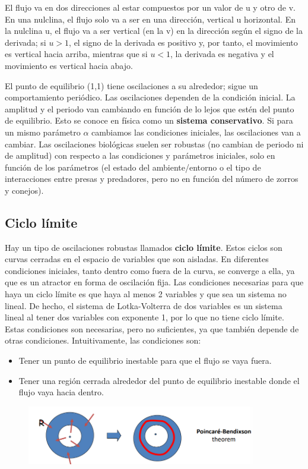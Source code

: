 El flujo va en dos direcciones al estar compuestos por un valor de u y otro de v. En una nulclina, el flujo solo va a ser en una dirección, vertical u horizontal. En la nulclina u, el flujo va a ser vertical (en la v) en la dirección según el signo de la derivada; si $u > 1$, el signo de la derivada es positivo y, por tanto, el movimiento es vertical hacia arriba, mientras que si $u < 1$, la derivada es negativa y el movimiento es vertical hacia abajo. 

El punto de equilibrio (1,1) tiene oscilaciones a su alrededor; sigue un comportamiento periódico. Las oscilaciones dependen de la condición inicial. La amplitud y el periodo van cambiando en función de lo lejos que estén del punto de equilibrio. Esto se conoce en física como un \textbf{sistema conservativo}.
Si para un mismo parámetro $\alpha$ cambiamos las condiciones iniciales, las oscilaciones van a cambiar. Las oscilaciones biológicas suelen ser robustas (no cambian de periodo ni de amplitud) con respecto a las condiciones y parámetros iniciales, solo en función de los parámetros (el estado del ambiente/entorno o el tipo de interacciones entre presas y predadores, pero no en función del número de zorros y conejos).

\subsection{Ciclo límite}
Hay un tipo de oscilaciones robustas llamados \textbf{ciclo límite}. Estos ciclos son curvas cerradas en el espacio de variables que son aisladas. En diferentes condiciones iniciales, tanto dentro como fuera de la curva, se converge a ella, ya que es un atractor en forma de oscilación fija. Las condiciones necesarias para que haya un ciclo límite es que haya al menos 2 variables y que sea un sistema no lineal. De hecho, el sistema de Lotka-Volterra de dos variables es un sistema lineal al tener dos variables con exponente 1, por lo que no tiene ciclo límite. Estas condiciones son necesarias, pero no suficientes, ya que también depende de otras condiciones. Intuitivamente, las condiciones son:
\begin{itemize}
\item Tener un punto de equilibrio inestable para que el flujo se vaya fuera.
\item Tener una región cerrada alrededor del punto de equilibrio inestable donde el flujo vaya hacia dentro.
\end{itemize}

\begin{figure}[h]
\centering
\includegraphics[width = 0.9\textwidth]{figs/ciclo-limite.png}
\end{figure}

